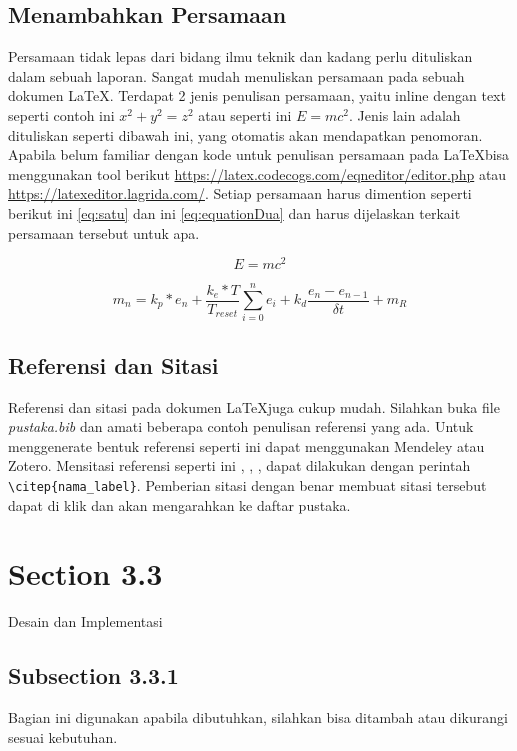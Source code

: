 \subsection{Menambahkan Persamaan}
Persamaan tidak lepas dari bidang ilmu teknik dan kadang perlu dituliskan dalam sebuah laporan. Sangat mudah menuliskan persamaan pada sebuah dokumen \LaTeX. Terdapat 2 jenis penulisan persamaan, yaitu inline dengan text seperti contoh ini \(x^2 + y^2 = z^2\) atau seperti ini $E=mc^2$. Jenis lain adalah dituliskan seperti dibawah ini, yang otomatis akan mendapatkan penomoran. Apabila belum familiar dengan kode untuk penulisan persamaan pada \LaTeX bisa menggunakan tool berikut \url{https://latex.codecogs.com/eqneditor/editor.php} atau \url{https://latexeditor.lagrida.com/}. Setiap persamaan harus dimention seperti berikut ini \cref{eq:satu} dan ini \cref{eq:equationDua} dan harus dijelaskan terkait persamaan tersebut untuk apa.

\begin{equation}
    \label{eq:satu}
    E=mc^2
\end{equation}

\begin{equation}
	\label{eq:equationDua}
	m_n = k_p*e_n + \frac{k_e*T}{T_{reset}}\sum_{i=0}^{n}e_i + k_d\frac{e_n - e_{n-1}}{\delta t} + m_{R}
\end{equation}

\subsection{Referensi dan Sitasi}
Referensi dan sitasi pada dokumen \LaTeX juga cukup mudah. Silahkan buka file \textit{pustaka.bib} dan amati beberapa contoh penulisan referensi yang ada. Untuk menggenerate bentuk referensi seperti ini dapat menggunakan Mendeley atau Zotero. Mensitasi referensi seperti ini \citep{Priambodo_2021}, \citep{Nasuha_2017}, \citep{Dhewa_Dharmawan_Priyambodo_2017}, \citep{Arifin_2015} dapat dilakukan dengan perintah \verb|\citep{nama_label}|. Pemberian sitasi dengan benar membuat sitasi tersebut dapat di klik dan akan mengarahkan ke daftar pustaka.

\section{Section 3.3}
Desain dan Implementasi

\subsection{Subsection 3.3.1}
Bagian ini digunakan apabila dibutuhkan, silahkan bisa ditambah atau dikurangi sesuai kebutuhan.


